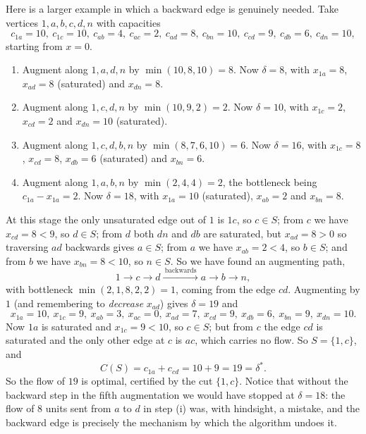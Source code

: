 \begin{example}
    Here is a larger example in which a backward edge is genuinely needed. Take vertices $1, a, b, c, d, n$ with capacities
    $$
    c_{1a} = 10,\ c_{1c} = 10,\ c_{ab} = 4,\ c_{ac} = 2,\ c_{ad} = 8,\ c_{bn} = 10,\ c_{cd} = 9,\ c_{db} = 6,\ c_{dn} = 10,
    $$
    starting from $x = 0$.
    \begin{enumerate}[label=(\roman*)]
        \item Augment along $1, a, d, n$ by $\min(10, 8, 10) = 8$. Now $\delta = 8$, with $x_{1a} = 8$, $x_{ad} = 8$ (saturated) and $x_{dn} = 8$.
        \item Augment along $1, c, d, n$ by $\min(10, 9, 2) = 2$. Now $\delta = 10$, with $x_{1c} = 2$, $x_{cd} = 2$ and $x_{dn} = 10$ (saturated).
        \item Augment along $1, c, d, b, n$ by $\min(8, 7, 6, 10) = 6$. Now $\delta = 16$, with $x_{1c} = 8$, $x_{cd} = 8$, $x_{db} = 6$ (saturated) and $x_{bn} = 6$.
        \item Augment along $1, a, b, n$ by $\min(2, 4, 4) = 2$, the bottleneck being $c_{1a} - x_{1a} = 2$. Now $\delta = 18$, with $x_{1a} = 10$ (saturated), $x_{ab} = 2$ and $x_{bn} = 8$.
    \end{enumerate}
    At this stage the only unsaturated edge out of $1$ is $1c$, so $c \in S$; from $c$ we have $x_{cd} = 8 < 9$, so $d \in S$; from $d$ both $dn$ and $db$ are saturated, but $x_{ad} = 8 > 0$ so traversing $ad$ backwards gives $a \in S$; from $a$ we have $x_{ab} = 2 < 4$, so $b \in S$; and from $b$ we have $x_{bn} = 8 < 10$, so $n \in S$. So we have found an augmenting path,
    $$
    1 \rightarrow c \rightarrow d \xrightarrow{\ \text{backwards}\ } a \rightarrow b \rightarrow n,
    $$
    with bottleneck $\min(2, 1, 8, 2, 2) = 1$, coming from the edge $cd$. Augmenting by $1$ (and remembering to \emph{decrease} $x_{ad}$) gives $\delta = 19$ and
    $$
    x_{1a} = 10,\ x_{1c} = 9,\ x_{ab} = 3,\ x_{ac} = 0,\ x_{ad} = 7,\ x_{cd} = 9,\ x_{db} = 6,\ x_{bn} = 9,\ x_{dn} = 10.
    $$
    Now $1a$ is saturated and $x_{1c} = 9 < 10$, so $c \in S$; but from $c$ the edge $cd$ is saturated and the only other edge at $c$ is $ac$, which carries no flow. So $S = \{1, c\}$, and
    $$
    C(S) = c_{1a} + c_{cd} = 10 + 9 = 19 = \delta^*.
    $$
    So the flow of $19$ is optimal, certified by the cut $\{1, c\}$. Notice that without the backward step in the fifth augmentation we would have stopped at $\delta = 18$: the flow of $8$ units sent from $a$ to $d$ in step (i) was, with hindsight, a mistake, and the backward edge is precisely the mechanism by which the algorithm undoes it.
\end{example}

